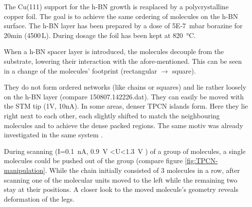 The Cu(111) support for the h-BN growth is reaplaced by a polycrystalline copper foil. The goal is to achieve the same ordering of molecules on the h-BN surface. The h-BN layer has been prepared by a dose of \SI{5E-7}{\milli\bar} borazine for 20min (4500\,L). During dosage the foil has been kept at \SI{820}{\degreeCelsius}.

When a h-BN spacer layer is introduced, the molecules decouple from the substrate, lowering their interaction with the afore-mentioned. This can be seen in a change of the molecules' footprint (rectangular $\rightarrow$ square).

They do not form ordered networks (like chains or squares) and lie rather loosely on the h-BN layer (compare 150807.142226.dat). They can easily be moved with the STM tip (1V, 10nA). In some areas, denser TPCN islands form. Here they lie right next to each other, each slightly shifted to match the neighbouring molecules and to achieve the dense packed regions. The same motiv was already investigated in the same system \cite{urgel_controlling_2015}.

During scanning (I=\SI{0.1}{\nA}, \SI{0.9}{\V} <U<\SI{1.3}{\V} ) of a group of molecules, a single molecules could be pushed out of the group (compare figure \ref{fig:TPCN-manipulation}. While the chain initially consisted of 3 molecules in a row, after scanning one of the molecular units moved to the left while the remaining two stay at their positions. A closer look to the moved molecule's geometry reveals deformation of the legs.

